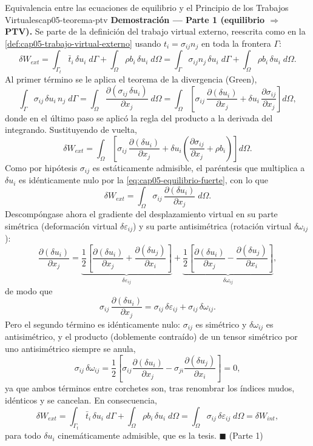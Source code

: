 \begin{teorema}{Equivalencia entre las ecuaciones de equilibrio y el Principio de los Trabajos Virtuales}{cap05-teorema-ptv}
\medskip
\textbf{Demostración --- Parte 1 (equilibrio $\Rightarrow$ PTV).}
Se parte de la definición del trabajo virtual externo, reescrita como en la \cref{def:cap05-trabajo-virtual-externo} usando $t_i=\sigma_{ij}n_j$ en toda la frontera $\Gamma$:
\[
\delta W_{ext} = \int_{\Gamma_t}\bar t_i\,\delta u_i\;d\Gamma + \int_\Omega \rho b_i\,\delta u_i\;d\Omega = \int_\Gamma \sigma_{ij}n_j\,\delta u_i\;d\Gamma + \int_\Omega \rho b_i\,\delta u_i\;d\Omega .
\]
Al primer término se le aplica el teorema de la divergencia (Green),
\[
\int_\Gamma \sigma_{ij}\,\delta u_i\, n_j\;d\Gamma = \int_\Omega \frac{\partial(\sigma_{ij}\,\delta u_i)}{\partial x_j}\;d\Omega = \int_\Omega \left[\sigma_{ij}\,\frac{\partial(\delta u_i)}{\partial x_j} + \delta u_i\,\frac{\partial \sigma_{ij}}{\partial x_j}\right] d\Omega ,
\]
donde en el último paso se aplicó la regla del producto a la derivada del integrando. Sustituyendo de vuelta,
\[
\delta W_{ext} = \int_\Omega \left[\sigma_{ij}\,\frac{\partial(\delta u_i)}{\partial x_j} + \delta u_i\left(\frac{\partial \sigma_{ij}}{\partial x_j} + \rho b_i\right)\right] d\Omega .
\]
Como por hipótesis $\sigma_{ij}$ es estáticamente admisible, el paréntesis que multiplica a $\delta u_i$ es idénticamente nulo por la \cref{eq:cap05-equilibrio-fuerte}, con lo que
\[
\delta W_{ext} = \int_\Omega \sigma_{ij}\,\frac{\partial(\delta u_i)}{\partial x_j}\;d\Omega .
\]
Descompóngase ahora el gradiente del desplazamiento virtual en su parte simétrica (deformación virtual $\delta\varepsilon_{ij}$) y su parte antisimétrica (rotación virtual $\delta\omega_{ij}$):
\[
\frac{\partial(\delta u_i)}{\partial x_j} = \underbrace{\frac12\left[\frac{\partial(\delta u_i)}{\partial x_j}+\frac{\partial(\delta u_j)}{\partial x_i}\right]}_{\displaystyle \delta\varepsilon_{ij}} + \underbrace{\frac12\left[\frac{\partial(\delta u_i)}{\partial x_j}-\frac{\partial(\delta u_j)}{\partial x_i}\right]}_{\displaystyle \delta\omega_{ij}} ,
\]
de modo que
\[
\sigma_{ij}\,\frac{\partial(\delta u_i)}{\partial x_j} = \sigma_{ij}\,\delta\varepsilon_{ij} + \sigma_{ij}\,\delta\omega_{ij} .
\]
Pero el segundo término es idénticamente nulo: $\sigma_{ij}$ es simétrico y $\delta\omega_{ij}$ es antisimétrico, y el producto (doblemente contraído) de un tensor simétrico por uno antisimétrico siempre se anula,
\[
\sigma_{ij}\,\delta\omega_{ij} = \frac12\left[\sigma_{ij}\frac{\partial(\delta u_i)}{\partial x_j} - \sigma_{ji}\frac{\partial(\delta u_j)}{\partial x_i}\right] = 0,
\]
ya que ambos términos entre corchetes son, tras renombrar los índices mudos, idénticos y se cancelan. En consecuencia,
\[
\delta W_{ext} = \int_{\Gamma_t}\bar t_i\,\delta u_i\;d\Gamma + \int_\Omega \rho b_i\,\delta u_i\;d\Omega = \int_\Omega \sigma_{ij}\,\delta\varepsilon_{ij}\;d\Omega = \delta W_{int} ,
\]
para todo $\delta u_i$ cinemáticamente admisible, que es la tesis. \hfill$\blacksquare$ (Parte 1)


\end{teorema}
